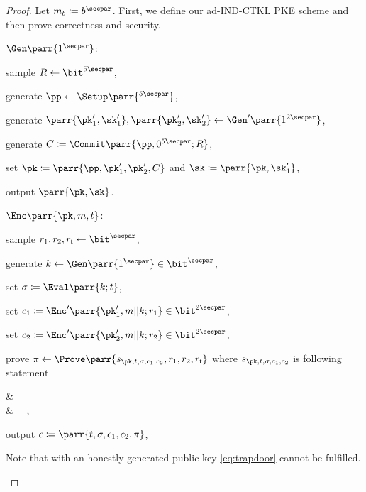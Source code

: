 \begin{proof}
    Let \(m_b \coloneqq b^\secpar\).
    First, we define our ad-IND-CTKL PKE scheme and then prove correctness and security.
    \begin{sitemize}
        \item \(\Gen\parr{1^\secpar}\):
        \begin{sitemize}
            \item sample \(R \gets \bit^{5\secpar}\),
            \item generate \(\pp \gets \Setup\parr{^{5\secpar}}\),
            \item generate \(\parr{\pk'_1,\sk'_1}, \parr{\pk'_2,\sk'_2} \gets \Gen'\parr{1^{2\secpar}}\),
            \item generate \(C \coloneqq \Commit\parr{\pp,0^{5\secpar};R}\),
            \item set \(\pk \coloneqq \parr{\pp,\pk'_1,\pk'_2,C}\) and \(\sk \coloneqq \parr{\pk,\sk'_1}\),
            \item output \(\parr{\pk,\sk}\).
        \end{sitemize}

        \item \(\Enc\parr{\pk,m,t}\):
        \begin{sitemize}
            \item sample \(r_1,r_2,r_{\mathsf{t}} \gets \bit^\secpar\),
            \item generate \(k \gets \Gen\parr{1^\secpar} \in \bit^\secpar\),
            \item set \(\sigma \coloneqq \Eval\parr{k;t}\),
            \item set \(c_1 \coloneqq \Enc'\parr{\pk'_1,m||k;r_1} \in \bit^{2\secpar}\),
            \item set \(c_2 \coloneqq \Enc'\parr{\pk'_2,m||k;r_2} \in \bit^{2\secpar}\),
            \item prove \(\pi \gets \Prove\parr{s_{\pk,t,\sigma,c_1,c_2},r_1,r_2,r_{\mathsf{t}}}\) where \(s_{\pk,t,\sigma,c_1,c_2}\) is following statement
            \begin{bralign}\label{eq:consistency}
                &\ 
                \\\label{eq:trapdoor}
                \vee
                &\ 
                \ ,
            \end{bralign}
            \item output \(c \coloneqq \parr{t,\sigma,c_1,c_2,\pi}\),
        \end{sitemize}
        Note that with an honestly generated public key \cref{eq:trapdoor} cannot be fulfilled.


\end{sitemize}
\end{proof}
